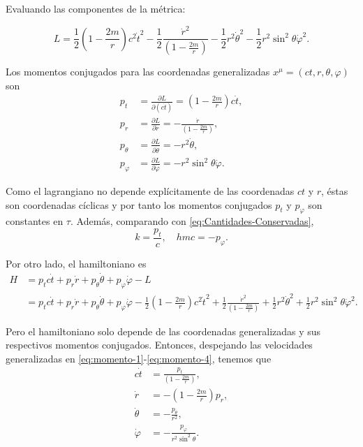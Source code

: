 \documentclass[letterpaper,11pt]{article}
\begin{document}
Evaluando las componentes de la métrica:
\begin{shaded}
\begin{equation}
L = \frac{1}{2} \left( 1 - \frac{2m}{r}\right)c^2 \dot{t}^2 - \frac{1}{2} \frac{\dot{r}^2}{\left( 1 - \frac{2m}{r}\right) }  - \frac{1}{2} r^2 \dot{\theta}^2 - \frac{1}{2} r^2\sin^2\theta \dot{\varphi}^2.
\end{equation}
\end{shaded}

Los momentos conjugados para las coordenadas generalizadas $x^{\mu} = (ct,r,\theta,\varphi)$ son 
\begin{align}
p_t &= \frac{\partial L}{\partial (c \dot{t})} = \left( 1 - \frac{2m}{r}\right)c \dot{t}, \label{eq:momento-1} \\
p_r &= \frac{\partial L}{\partial \dot{r}} = - \frac{\dot{r}}{\left( 1 - \frac{2m}{r}\right)}, \label{eq:momento-2}\\
p_{\theta} &= \frac{\partial L}{\partial \dot{\theta}} = - r^2\dot{\theta}, \label{eq:momento-3}\\
p_{\varphi} &= \frac{\partial L}{\partial \dot{\varphi}} = - r^2\sin^2\theta \dot{\varphi}. \label{eq:momento-4}
\end{align}

Como el lagrangiano no depende explícitamente de las coordenadas $ct$ y $r$, éstas son coordenadas cíclicas y por tanto los momentos conjugados $p_t$ y $p_{\varphi}$ son constantes en $\tau$. Además, comparando con \eqref{eq:Cantidades-Conservadas}, 
\begin{equation}
k = \frac{p_t}{c}, \quad hmc = - p_{\varphi}.
\end{equation}

Por otro lado, el hamiltoniano es
\begin{align}
H &= p_t c\dot{t} + p_r \dot{r} + p_{\theta} \dot{\theta} + p_{\varphi} \dot{\varphi} - L \nonumber \\
&= p_t c\dot{t} + p_r \dot{r} + p_{\theta} \dot{\theta} + p_{\varphi} \dot{\varphi} - \frac{1}{2} \left( 1 - \frac{2m}{r}\right)c^2 \dot{t}^2 + \frac{1}{2} \frac{\dot{r}^2}{\left( 1 - \frac{2m}{r}\right) }  + \frac{1}{2} r^2 \dot{\theta}^2 + \frac{1}{2} r^2\sin^2\theta \dot{\varphi}^2. \label{eq:pre-Hamiltonian}
\end{align}

Pero el hamiltoniano solo depende de las coordenadas generalizadas y sus respectivos momentos conjugados. Entonces, despejando las velocidades generalizadas en \eqref{eq:momento-1}-\eqref{eq:momento-4}, tenemos que
\begin{align}
 c \dot{t} &= \frac{p_t}{\left( 1 - \frac{2m}{r}\right)}, \label{eq:vel-1} \\
\dot{r} &=  - \left( 1 - \frac{2m}{r}\right) p_r, \label{eq:vel-2}\\
\dot{\theta} &= - \frac{p_{\theta}}{r^2}, \label{eq:vel-3} \\
\dot{\varphi} &= - \frac{p_{\varphi}}{r^2\sin^2\theta}. \label{eq:vel-4}
\end{align}
\end{document}
